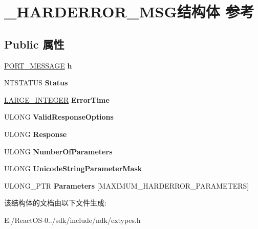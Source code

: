 \hypertarget{struct___h_a_r_d_e_r_r_o_r___m_s_g}{}\section{\+\_\+\+H\+A\+R\+D\+E\+R\+R\+O\+R\+\_\+\+M\+S\+G结构体 参考}
\label{struct___h_a_r_d_e_r_r_o_r___m_s_g}
\subsection*{Public 属性}
\begin{DoxyCompactItemize}
\item 
\mbox{\label{struct___h_a_r_d_e_r_r_o_r___m_s_g_a09bdb1733d08e26f2b6e1a8e7c4242cd}} 
\hyperlink{struct___p_o_r_t___m_e_s_s_a_g_e___h_e_a_d_e_r}{P\+O\+R\+T\+\_\+\+M\+E\+S\+S\+A\+GE} {\bfseries h}
\item 
\mbox{\label{struct___h_a_r_d_e_r_r_o_r___m_s_g_a09ea9e1b300975bb71fe24bc37920533}} 
N\+T\+S\+T\+A\+T\+US {\bfseries Status}
\item 
\mbox{\label{struct___h_a_r_d_e_r_r_o_r___m_s_g_aee932559991cb8276e4c651f8c9dee0f}} 
\hyperlink{union___l_a_r_g_e___i_n_t_e_g_e_r}{L\+A\+R\+G\+E\+\_\+\+I\+N\+T\+E\+G\+ER} {\bfseries Error\+Time}
\item 
\mbox{\label{struct___h_a_r_d_e_r_r_o_r___m_s_g_a39a959c26d29fcab1d4e6a0042d03735}} 
U\+L\+O\+NG {\bfseries Valid\+Response\+Options}
\item 
\mbox{\label{struct___h_a_r_d_e_r_r_o_r___m_s_g_ab46c675a5e080f65925c44b5c2c08e23}} 
U\+L\+O\+NG {\bfseries Response}
\item 
\mbox{\label{struct___h_a_r_d_e_r_r_o_r___m_s_g_ac4a45e24bdd16eceee90e677fae16cf3}} 
U\+L\+O\+NG {\bfseries Number\+Of\+Parameters}
\item 
\mbox{\label{struct___h_a_r_d_e_r_r_o_r___m_s_g_af740cb0dc5ebe2e8e3971ce9c990a1d2}} 
U\+L\+O\+NG {\bfseries Unicode\+String\+Parameter\+Mask}
\item 
\mbox{\label{struct___h_a_r_d_e_r_r_o_r___m_s_g_af2f75f921633038026b09b183579bd57}} 
U\+L\+O\+N\+G\+\_\+\+P\+TR {\bfseries Parameters} \mbox{[}M\+A\+X\+I\+M\+U\+M\+\_\+\+H\+A\+R\+D\+E\+R\+R\+O\+R\+\_\+\+P\+A\+R\+A\+M\+E\+T\+E\+RS\mbox{]}
\end{DoxyCompactItemize}


该结构体的文档由以下文件生成\+:\begin{DoxyCompactItemize}
\item 
E\+:/\+React\+O\+S-\/0../sdk/include/ndk/extypes.\+h\end{DoxyCompactItemize}
